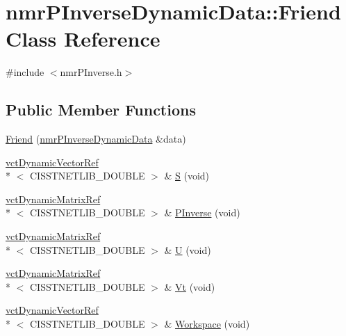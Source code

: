 \hypertarget{classnmr_p_inverse_dynamic_data_1_1_friend}{\section{nmr\-P\-Inverse\-Dynamic\-Data\-:\-:Friend Class Reference}
\label{classnmr_p_inverse_dynamic_data_1_1_friend}
}


{\ttfamily \#include $<$nmr\-P\-Inverse.\-h$>$}

\subsection*{Public Member Functions}
\begin{DoxyCompactItemize}
\item 
\hyperlink{classnmr_p_inverse_dynamic_data_1_1_friend_acf0196a1908ee13e41353ffae6072fba}{Friend} (\hyperlink{classnmr_p_inverse_dynamic_data}{nmr\-P\-Inverse\-Dynamic\-Data} \&data)
\item 
\hyperlink{classvct_dynamic_vector_ref}{vct\-Dynamic\-Vector\-Ref}\\*
$<$ C\-I\-S\-S\-T\-N\-E\-T\-L\-I\-B\-\_\-\-D\-O\-U\-B\-L\-E $>$ \& \hyperlink{classnmr_p_inverse_dynamic_data_1_1_friend_aa21fa5551ee097212347735df394b596}{S} (void)
\item 
\hyperlink{classvct_dynamic_matrix_ref}{vct\-Dynamic\-Matrix\-Ref}\\*
$<$ C\-I\-S\-S\-T\-N\-E\-T\-L\-I\-B\-\_\-\-D\-O\-U\-B\-L\-E $>$ \& \hyperlink{classnmr_p_inverse_dynamic_data_1_1_friend_aa94f4cd2c700eb3b527bd5f84d23bf3d}{P\-Inverse} (void)
\item 
\hyperlink{classvct_dynamic_matrix_ref}{vct\-Dynamic\-Matrix\-Ref}\\*
$<$ C\-I\-S\-S\-T\-N\-E\-T\-L\-I\-B\-\_\-\-D\-O\-U\-B\-L\-E $>$ \& \hyperlink{classnmr_p_inverse_dynamic_data_1_1_friend_a2c1c53c318c3a47ccb5655598fec0bec}{U} (void)
\item 
\hyperlink{classvct_dynamic_matrix_ref}{vct\-Dynamic\-Matrix\-Ref}\\*
$<$ C\-I\-S\-S\-T\-N\-E\-T\-L\-I\-B\-\_\-\-D\-O\-U\-B\-L\-E $>$ \& \hyperlink{classnmr_p_inverse_dynamic_data_1_1_friend_aa436a1939f0f59d969ca534bb4f6c075}{Vt} (void)
\item 
\hyperlink{classvct_dynamic_vector_ref}{vct\-Dynamic\-Vector\-Ref}\\*
$<$ C\-I\-S\-S\-T\-N\-E\-T\-L\-I\-B\-\_\-\-D\-O\-U\-B\-L\-E $>$ \& \hyperlink{classnmr_p_inverse_dynamic_data_1_1_friend_ab25993edd9af436758b7a817b3042a87}{Workspace} (void)

\end{DoxyCompactItemize}
